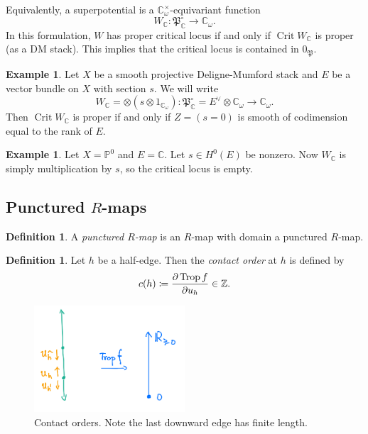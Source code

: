 \documentclass[10pt]{amsart}
\theoremstyle{definition}
\newtheorem{defn}[thm]{Definition}
\newtheorem{exm}[thm]{Example}
\theoremstyle{remark}
\theoremstyle{plain}
\theoremstyle{definition}
\theoremstyle{remark}
\newcommand{\C}{\mathbb{C}}
\newcommand{\Z}{\mathbb{Z}}
\renewcommand{\P}{\mathbb{P}}
\newcommand{\mf}[1]{\mathfrak{#1}}
\newcommand{\on}[1]{\operatorname{#1}}
\newcommand{\1}{\mathbf{1}}
\newcommand{\2}{\mathbf{2}}
\newcommand{\3}{\mathbf{3}}
\DeclareMathOperator{\Crit}{Crit}
\begin{document}
Equivalently, a superpotential is a $\C_{\omega}^{\times}$-equivariant function
\[ W_{\C} \colon \mf{P}_{\C}^{\circ} \to \C_{\omega}. \]
In this formulation, $W$ has proper critical locus if and only if $\on{Crit} W_{\C}$ is proper (as a DM stack). This implies that the critical locus is contained in $0_{\mf{P}}$.

\begin{exm}
    Let $X$ be a smooth projective Deligne-Mumford stack and $E$ be a vector bundle on $X$ with section $s$. We will write
    \[ W_{\C} = \otimes (s \otimes 1_{\C_{\omega}}) \colon \mf{P}_{\C}^{\circ} = E^{\vee} \otimes \C_{\omega} \to \C_{\omega}. \]
    Then $\Crit W_{\C}$ is proper if and only if $Z = (s=0)$ is smooth of codimension equal to the rank of $E$.
\end{exm}

\begin{exm}
    Let $X = \P^0$ and $E = \C$. Let $s \in H^0(E)$ be nonzero. Now $W_{\C}$ is simply multiplication by $s$, so the critical locus is empty.
\end{exm}

\subsection{Punctured $R$-maps}%
\label{sub:Punctured R-maps}

\begin{defn}
    A \textit{punctured $R$-map} is an $R$-map with domain a punctured $R$-map.
\end{defn}

\begin{defn}
    Let $h$ be a half-edge. Then the \textit{contact order} at $h$ is defined by
    \[ c(h) \coloneqq \pdv{\on{Trop} f}{u_h} \in \Z. \]
\end{defn}

\begin{figure}[htpb]
    \centering
    \includegraphics[width=0.5\textwidth]{interval.png}
    \caption{Contact orders. Note the last downward edge has finite length.}
    \label{fig:interval-png}
\end{figure}
\end{document}
